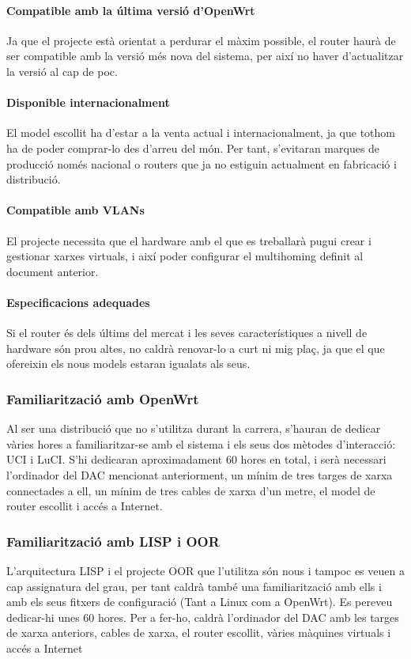 \documentclass[11pt]{article}
\begin{document}
\paragraph{Compatible amb la última versió d’OpenWrt}
Ja que el projecte està orientat a perdurar el màxim possible, el router haurà de ser compatible amb la versió més nova del sistema, per així no haver d’actualitzar la versió al cap de poc.
\paragraph{Disponible internacionalment}
El model escollit ha d’estar a la venta actual i internacionalment, ja que tothom ha de poder comprar-lo des d’arreu del món. Per tant, s’evitaran marques de producció només nacional o routers que ja no estiguin actualment en fabricació i distribució.
\paragraph{Compatible amb VLANs}
El projecte necessita que el hardware amb el que es treballarà pugui crear i gestionar xarxes virtuals, i així poder configurar el multihoming definit al document anterior.
\paragraph{Especificacions adequades}
Si el router és dels últims del mercat i les seves característiques a nivell de hardware són prou altes, no caldrà renovar-lo a curt ni mig plaç, ja que el que ofereixin els nous models estaran igualats als seus.
\subsubsection{Familiarització amb OpenWrt}
Al ser una distribució que no s’utilitza durant la carrera, s’hauran de dedicar vàries hores a familiaritzar-se amb el sistema i els seus dos mètodes d’interacció: UCI i LuCI. S’hi dedicaran aproximadament 60 hores en total, i serà necessari l’ordinador del DAC mencionat anteriorment, un mínim de tres targes de xarxa connectades a ell, un mínim de tres cables de xarxa d’un metre, el model de router escollit i accés a Internet.
\subsubsection{Familiarització amb LISP i OOR}
L’arquitectura LISP i el projecte OOR que l’utilitza són nous i tampoc es veuen a cap assignatura del grau, per tant caldrà també una familiarització amb ells i amb els seus fitxers de configuració (Tant a Linux com a OpenWrt). Es pereveu dedicar-hi unes 60 hores. Per a fer-ho, caldrà l’ordinador del DAC amb les targes de xarxa anteriors, cables de xarxa, el router escollit, vàries màquines virtuals i accés a Internet
\end{document}
